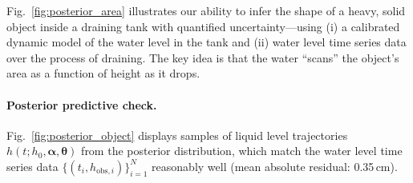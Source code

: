 \documentclass[openacc]{rsproca_new}%
\newcommand\thedata {$\{(t_i,h_{\text{obs}, i})\}_{i=1}^{N}$\xspace}
\newcommand\themodel {$h(t; h_0, \boldsymbol \alpha, \boldsymbol\theta)$\xspace}
\begin{document}
Fig.~\ref{fig:posterior_area} illustrates our ability to infer the shape of a heavy, solid object inside a draining tank with quantified uncertainty---using (i) a calibrated dynamic model of the water level in the tank and (ii) water level time series data over the process of draining. The key idea is that the water ``scans'' the object's area as a function of height as it drops.

\paragraph{Posterior predictive check.} Fig.~\ref{fig:posterior_object} displays samples of liquid level trajectories \themodel from the posterior distribution, which match the water level time series data \thedata reasonably well (mean absolute residual: 0.35\,cm). 
\end{document}
